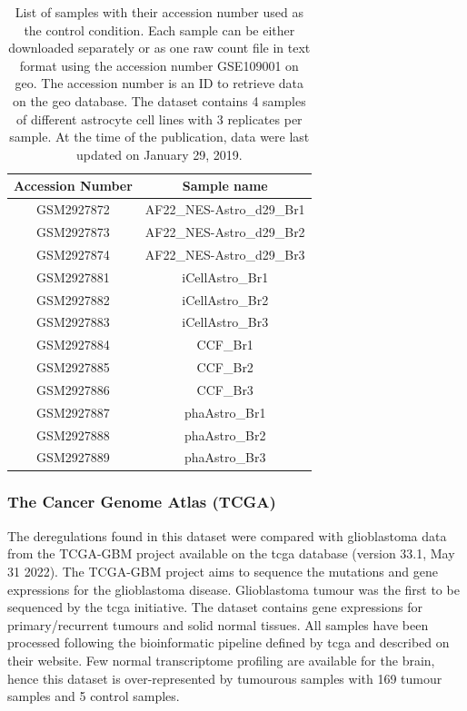 \begin{table}
    \centering
    \begin{tabular}{ |c|c| }
        \hline
        Accession Number & Sample name \\
        \hline
        GSM2927872 & AF22\_NES-Astro\_d29\_Br1 \\
        GSM2927873 & AF22\_NES-Astro\_d29\_Br2 \\
        GSM2927874 & AF22\_NES-Astro\_d29\_Br3 \\
        \hline
        GSM2927881 & iCellAstro\_Br1 \\
        GSM2927882 & iCellAstro\_Br2 \\
        GSM2927883 & iCellAstro\_Br3 \\
        \hline
        GSM2927884 & CCF\_Br1 \\
        GSM2927885 & CCF\_Br2 \\
        GSM2927886 & CCF\_Br3 \\
        \hline
        GSM2927887 & phaAstro\_Br1 \\ 
        GSM2927888 & phaAstro\_Br2 \\ 
        GSM2927889 & phaAstro\_Br3 \\ 
        \hline
    \end{tabular}
    \caption{
        List of samples with their accession number used as the control condition.
        Each sample can be either downloaded separately or as one raw count file in text format using the accession number GSE109001 on \acrfull{geo}.
        The accession number is an ID to retrieve data on the \acrshort{geo} database.
        The dataset contains 4 samples of different astrocyte cell lines with 3 replicates per sample.
        At the time of the publication, data were last updated on January 29, 2019.
    }
    \label{table:list-control-samples}
\end{table}

\subsubsection{The Cancer Genome Atlas (TCGA) }

The deregulations found in this dataset were compared with glioblastoma data from the TCGA-GBM project available on the \acrshort{tcga} database (version 33.1, May 31 2022).
The TCGA-GBM project aims to sequence the mutations and gene expressions for the glioblastoma disease.
Glioblastoma tumour was the first to be sequenced by the \acrshort{tcga} initiative.
The dataset contains gene expressions for primary/recurrent tumours and solid normal tissues.
All samples have been processed following the bioinformatic pipeline defined by \acrshort{tcga} and described on their website.
Few normal transcriptome profiling are available for the brain, hence this dataset is over-represented by tumourous samples with 169 tumour samples and 5 control samples.

